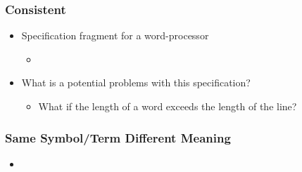 \documentclass[t,12pt,numbers,fleqn]{beamer}
\begin{document}

\begin{frame}
\frametitle{Consistent}

\begin{itemize}

\item Specification fragment for a word-processor
\begin{itemize}
\item {}
\end{itemize}
\item What is a potential problems with this specification?
\begin{itemize}
\item<2-> {\alert{What if the length of a word exceeds the length of the line?}}
\end{itemize}

\end{itemize}

\end{frame}


\begin{frame}
\frametitle{Same Symbol/Term Different Meaning}

\begin{itemize}

\item {}

\end{itemize}

\end{frame}

\end{document}

